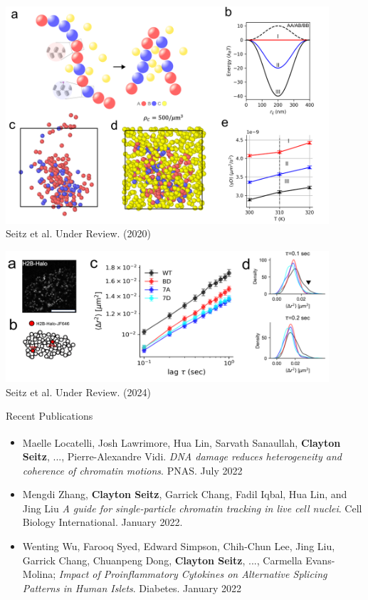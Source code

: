 \documentclass{beamer}					%
\begin{document}
\begin{frame}
\includegraphics[width=12cm]{media/MD}
\\
Seitz et al. Under Review. (2020)
\end{frame}

\begin{frame}
\includegraphics[width=12cm]{media/MSD}
\\
Seitz et al. Under Review. (2024)
\end{frame}


\begin{frame}{Recent Publications}

\begin{itemize}
\item Maelle Locatelli\textsuperscript{\textdagger}, Josh Lawrimore\textsuperscript{\textdagger}, Hua Lin\textsuperscript{\textdagger}, Sarvath Sanaullah, \textbf{Clayton Seitz}, ..., Pierre-Alexandre Vidi. \textit{DNA damage reduces heterogeneity and coherence of chromatin motions}. PNAS. July 2022\\
\vspace{0.1in}
\item Mengdi Zhang, \textbf{Clayton Seitz}, Garrick Chang, Fadil Iqbal, Hua Lin, and Jing Liu \textit{A guide for single-particle chromatin tracking in live cell nuclei}. Cell Biology International. January 2022.\\
\vspace{0.1in}
\item Wenting Wu, Farooq Syed, Edward Simpson, Chih-Chun Lee, Jing Liu, Garrick Chang, Chuanpeng Dong, \textbf{Clayton Seitz}, ..., Carmella Evans-Molina; \textit{Impact of Proinflammatory Cytokines on Alternative Splicing Patterns in Human Islets}. Diabetes. January 2022
\end{itemize}
\end{frame}
\end{document}
